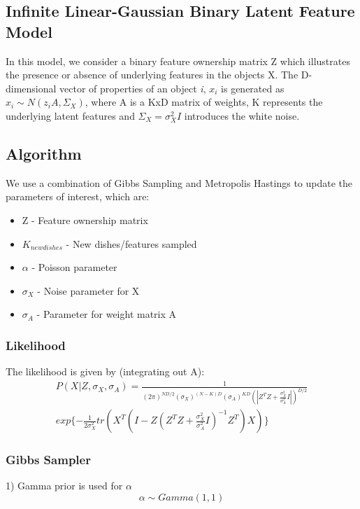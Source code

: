\documentclass[11pt]{article}
\begin{document}
\subsection{Infinite Linear-Gaussian Binary Latent Feature Model} 
In this model, we consider a binary feature ownership matrix Z which illustrates the presence or absence of underlying features in the objects X. The D-dimensional vector of properties of an object \textit{i}, $x_{i}$ is generated as $x_{i} \sim N(z_{i}A, \Sigma_{X})$, where A is a KxD matrix of weights, K represents the underlying latent features and $\Sigma_{X}=\sigma_{X}^2I$ introduces the white noise.

\subsection{Algorithm}
We use a combination of Gibbs Sampling and Metropolis Hastings to update the parameters of interest, which are:

\begin{itemize}
  \item Z - Feature ownership matrix
  \item $K_{newdishes}$ - New dishes/features sampled
  \item $\alpha$ - Poisson parameter
  \item $\sigma_{X}$ - Noise parameter for X
  \item $\sigma_{A}$ - Parameter for weight matrix A
\end{itemize}

\subsubsection{Likelihood}
The likelihood is given by (integrating out A):
\begin{multline*}
P(X|Z,\sigma_X, \sigma_A) = \frac{1}{(2 \pi)^{ND/2} (\sigma_X)^{(N-K)D}(\sigma_A)^{KD}(|Z^TZ+\frac{\sigma_X^2}{\sigma_A^2}I|)^{D/2}}\\
exp\{-\frac{1}{2\sigma_X^2}tr(X^T(I-Z(Z^TZ+\frac{\sigma_X^2}{\sigma_A^2}I)^{-1}Z^T)X)\}
\end{multline*}

\subsubsection{Gibbs Sampler}

1) Gamma prior is used for $\alpha$
$$
\alpha \sim Gamma(1,1)
$$\\
\end{document}
